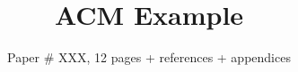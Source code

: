 \documentclass[sigconf, 10pt]{acmart}
\begin{document}


\date{}

\title{ACM Example}

\author{Paper \# XXX, 12 pages + references + appendices}

\renewcommand{\shortauthors}{Anonymous et al.}


\maketitle










\end{document}
